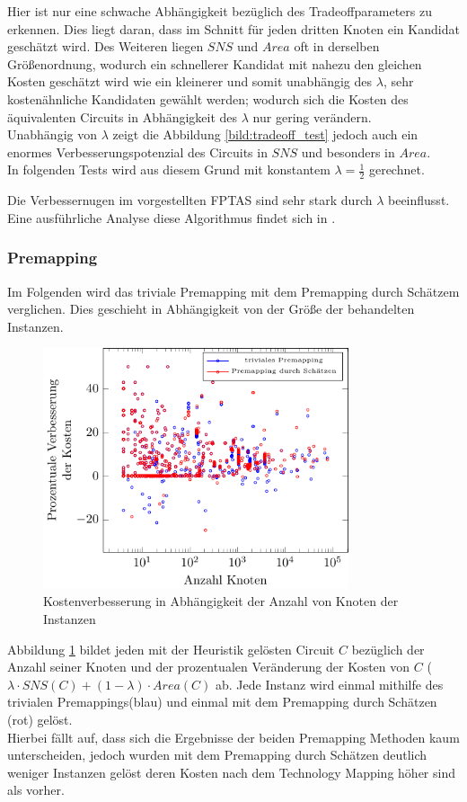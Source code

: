 \documentclass[11pt, a4paper, german]{article}
\newcommand{\TM}{Technology  Mapping }
\begin{document}
Hier ist nur eine schwache Abh\"angigkeit bez\"uglich des Tradeoffparameters zu erkennen. Dies liegt daran, dass im Schnitt f\"ur jeden dritten Knoten ein Kandidat gesch\"atzt wird. Des Weiteren liegen $SNS$ und $Area$ oft in derselben Gr\"o\ss enordnung, wodurch ein schnellerer Kandidat mit nahezu den gleichen Kosten gesch\"atzt wird wie ein kleinerer und somit unabhängig des $\lambda$, sehr kosten\"ahnliche Kandidaten gew\"ahlt werden; wodurch sich die Kosten des \"aquivalenten Circuits in Abh\"angigkeit des $\lambda$ nur gering ver\"andern.\\
Unabh\"angig von $\lambda$ zeigt die Abbildung \ref{bild:tradeoff_test} jedoch auch ein enormes Verbesserungspotenzial des Circuits in $SNS$ und besonders in $Area$.\\
In folgenden Tests wird aus diesem Grund mit konstantem $\lambda = \frac{1}{2}$ gerechnet.

Die Verbessernugen im vorgestellten FPTAS sind sehr stark durch $\lambda$ beeinflusst. Eine ausf\"uhrliche Analyse diese Algorithmus findet sich in \cite{Elbert}.


\subsubsection{Premapping}
Im Folgenden wird das triviale Premapping mit dem Premapping durch Sch\"atzem verglichen. Dies geschieht in Abh\"angigkeit von der Gr\"o{\ss}e der behandelten Instanzen. \\
\begin{figure}[h]
		\centering
		\includegraphics[width = 9cm]{pictures/tex_files/analysis/prem_test}
		\caption{Kostenverbesserung in Abh\"angigkeit der Anzahl von Knoten der Instanzen}
		\label{bild:prem_test}
\end{figure}

Abbildung \ref{bild:prem_test} bildet jeden mit der Heuristik gel\"osten Circuit $C$ bez\"uglich der Anzahl seiner Knoten und der prozentualen Ver\"anderung der Kosten von $C$ ($\lambda \cdot SNS(C) + (1-\lambda) \cdot Area(C)$ ab. Jede Instanz wird einmal mithilfe des trivialen Premappings(blau) und einmal mit dem Premapping durch Sch\"atzen (rot) gel\"ost.\\
Hierbei f\"allt auf, dass sich die Ergebnisse der beiden Premapping Methoden kaum unterscheiden, jedoch wurden mit dem Premapping durch Sch\"atzen deutlich weniger Instanzen gel\"ost deren Kosten nach dem \TM h\"oher sind als vorher. \\
\end{document}
